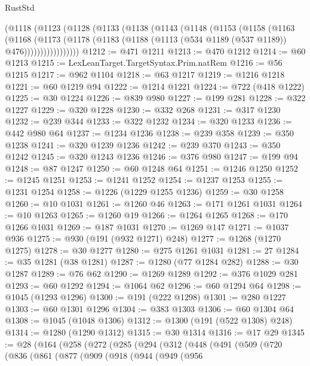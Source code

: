 \begin{lexlean}{RustStd}
\begin{coremodule}
      (@1118
        (@1123
          (@1128
            (@1133
              (@1138
                (@1143
                  (@1148
                    (@1153
                      (@1158
                        (@1163
                          (@1168
                            (@1173
                              (@1178
                                (@1183 (@1188 (@1113 (@534 @1189 (@537 @1189)) @476)))))))))))))))))
@1212 := @471 @1211
@1213 := @470 @1212
@1214 := @60 @1213
@1215 := LexLeanTarget.TargetSyntax.Prim.natRem
@1216 := @56 @1215
@1217 := @962 @1104
@1218 := @63 @1217
@1219 := @1216 @1218
@1221 := @60 @1219 @94
@1222 := @1214 @1221
@1224 := @722 (@418 @1222)
@1225 := @30 @1224
@1226 := @839 @980
@1227 := @199 @281
@1228 := @322 @1227
@1229 := @320 @1228
@1230 := @332 @268
@1231 := @317 @1230
@1232 := @239 @344
@1233 := @322 @1232
@1234 := @320 @1233
@1236 := @442 @980 @64
@1237 := @1234 @1236
@1238 := @239 @358
@1239 := @350 @1238
@1241 := @320 @1239 @1236
@1242 := @239 @370
@1243 := @350 @1242
@1245 := @320 @1243 @1236
@1246 := @376 @980
@1247 := @199 @94
@1248 := @87 @1247
@1250 := @60 @1248 @64
@1251 := @1246 @1250
@1252 := @1245 @1251
@1253 := @1241 @1252
@1254 := @1237 @1253
@1255 := @1231 @1254
@1258 := @1226 (@1229 @1255 @1236)
@1259 := @30 @1258
@1260 := @10 @1031
@1261 := @1260 @46
@1263 := @171 @1261 @1031
@1264 := @10 @1263
@1265 := @1260 @19
@1266 := @1264 @1265
@1268 := @170 @1266 @1031
@1269 := @187 @1031
@1270 := @1269 @147
@1271 := @1037 @936
@1275 := @930 (@191 (@932 @1271) @248)
@1277 := @1268 (@1270 @1275)
@1278 := @30 @1277
@1280 := @275 @1261 @1031
@1281 := 27
@1284 := @35 @1281 (@38 @1281)
@1287 := @1280 (@77 @1284 @282)
@1288 := @30 @1287
@1289 := @76 @62
@1290 := @1269 @1289
@1292 := @376 @1029 @281
@1293 := @60 @1292
@1294 := @1064 @62
@1296 := @60 @1294 @64
@1298 := @1045 (@1293 @1296)
@1300 := @191 (@222 @1298)
@1301 := @280 @1227
@1303 := @60 @1301 @1296
@1304 := @383 @1303
@1306 := @60 @1304 @64
@1308 := @1045 (@1048 @1306)
@1312 := @1300 (@191 (@522 @1308) @248)
@1314 := @1280 (@1290 @1312)
@1315 := @30 @1314
@1316 := @17 @29
@1345 := @28
    (@164
      (@258
        (@272
          (@285
            (@294
              (@312
                (@448
                  (@491
                    (@509
                      (@720
                        (@836
                          (@861
                            (@877
                              (@909
                                (@918
                                  (@944
                                    (@949
                                      (@956

\end{coremodule}
\end{lexlean}
